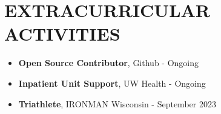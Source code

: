 \documentclass[letterpaper,11pt]{article}
\newcommand{\resumeItem}[1]{
  \item\small{
    {#1 \vspace{-1pt}}
  }
}
\newcommand{\resumeItemListStart}{\begin{itemize}[leftmargin=0.1in]}
\newcommand{\resumeItemListEnd}{\end{itemize}\vspace{-5pt}}
\begin{document}
    
    

    
      

\section{\color{airforceblue}EXTRACURRICULAR ACTIVITIES}
    
      \resumeItemListStart

        \resumeItem{\normalsize{\textbf{Open Source Contributor}, Github -} {Ongoing}}    
        \vspace{-5pt}

        \resumeItem{\normalsize{\textbf{Inpatient Unit Support}, UW Health -} {Ongoing}}
        \vspace{-5pt}

        \resumeItem{\normalsize{\textbf{Triathlete}, IRONMAN Wisconsin -} {September 2023}}
        \vspace{-5pt}

      \resumeItemListEnd 
      
\vspace{-12pt}
\end{document}
